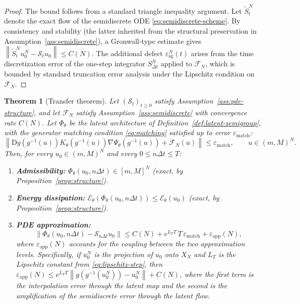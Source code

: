 \documentclass[11pt]{article}
\newtheorem{theorem}{Theorem}
\newcommand{\cS}{\mathcal{S}}
\newcommand{\cE}{\mathcal{E}}
\newcommand{\cFN}{\mathcal{F}_N}
\newcommand{\PhiT}{\Phi_{\theta}}
\newcommand{\norm}[1]{\left\lVert #1 \right\rVert}
\begin{document}
\begin{proof}
The bound follows from a standard triangle inequality argument. Let $\tilde S_t^N$ denote the exact flow of the semidiscrete ODE \eqref{eq:semidiscrete-scheme}. By consistency and stability (the latter inherited from the structural preservation in Assumption~\ref{ass:semidiscrete}), a Gronwall-type estimate gives $\norm{\tilde S_t^N u_0^N-\cS_tu_0}\le C(N)$. The additional defect $\varepsilon_{\mathrm{sg}}^N(t)$ arises from the time discretization error of the one-step integrator $S_{\Delta t}^N$ applied to $\cFN$, which is bounded by standard truncation error analysis under the Lipschitz condition on $\cFN$.
\end{proof}

\begin{theorem}[Transfer theorem]\label{thm:transfer}
Let $(\cS_t)_{t\ge 0}$ satisfy Assumption~\ref{ass:pde-structure}, and let $\cFN$ satisfy Assumption~\ref{ass:semidiscrete} with convergence rate $C(N)$. Let $\PhiT$ be the latent architecture of Definition~\ref{def:latent-semigroup}, with the generator matching condition \eqref{eq:matching} satisfied up to error $\varepsilon_{\mathrm{match}}$:
\begin{equation}\label{eq:matching-error}
\norm{\mathrm{D}g(g^{-1}(u))K_{\theta}(g^{-1}(u))\nabla \Psi_{\theta}(g^{-1}(u))+\cFN(u)}\le \varepsilon_{\mathrm{match}}, \qquad u\in (m,M)^N.
\end{equation}
Then, for every $u_0\in (m,M)^N$ and every $0\le n\Delta t\le T$:
\begin{enumerate}[label=(\roman*)]
    \item \textbf{Admissibility:} $\PhiT(u_0,n\Delta t)\in [m,M]^N$ (exact, by Proposition~\ref{prop:structure}).
    \item \textbf{Energy dissipation:} $\cE_{\theta}(\PhiT(u_0,n\Delta t))\le \cE_{\theta}(u_0)$ (exact, by Proposition~\ref{prop:structure}).
    \item \textbf{PDE approximation:}
    \begin{equation}\label{eq:transfer-bound}
    \norm{\PhiT(u_0,n\Delta t)-\cS_{n\Delta t}u_0}\le C(N)+e^{L_TT}\,T\,\varepsilon_{\mathrm{match}}+\varepsilon_{\mathrm{app}}(N),
    \end{equation}
    where $\varepsilon_{\mathrm{app}}(N)$ accounts for the coupling between the two approximation levels. Specifically, if $u_0^N$ is the projection of $u_0$ onto $X_N$ and $L_T$ is the Lipschitz constant from \eqref{eq:lipschitz-step}, then $\varepsilon_{\mathrm{app}}(N)\le e^{L_TT}\norm{g(g^{-1}(u_0^N))-u_0^N}+C(N)$, where the first term is the interpolation error through the latent map and the second is the amplification of the semidiscrete error through the latent flow.
\end{enumerate}
\end{theorem}
\end{document}
